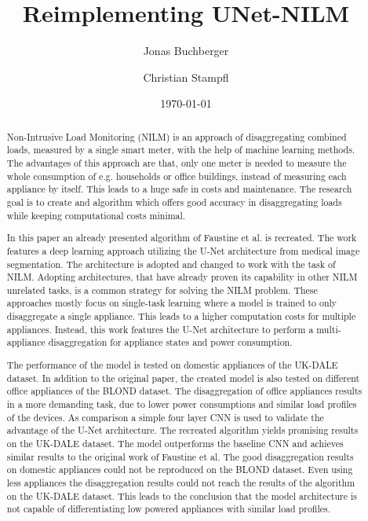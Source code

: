 \documentclass[sigconf]{acmart}
\title{Reimplementing UNet-NILM}
\date{\today}
\author{Jonas Buchberger}
\affiliation{Technical University Munich}
\affiliation{Munich, Germany}
\author{Christian Stampfl}
\affiliation{Technical University Munich}
\affiliation{Munich, Germany}
\begin{document}


\begin{abstract}
  Non-Intrusive Load Monitoring (NILM) is an approach of disaggregating combined loads, measured by a single smart meter, with the help of machine learning methods.
  The advantages of this approach are that, only one meter is needed to measure the whole consumption of e.g. households or office buildings, instead of measuring each appliance by itself.
  This leads to a huge safe in costs and maintenance.
  The research goal is to create and algorithm which offers good accuracy in disaggregating loads while keeping computational costs minimal.
  
  In this paper an already presented algorithm of Faustine et al. is recreated.
  The work features a deep learning approach utilizing the U-Net architecture from medical image segmentation.
  The architecture is adopted and changed to work with the task of NILM.
  Adopting architectures, that have already proven its capability in other NILM unrelated tasks, is a common strategy for solving the NILM problem. %
  These approaches mostly focus on single-task learning where a model is trained to only disaggregate a single appliance.
  This leads to a higher computation costs for multiple appliances.
  Instead, this work features the U-Net architecture to perform a multi-appliance disaggregation for appliance states and power consumption.

  The performance of the model is tested on domestic appliances of the UK-DALE dataset.
  In addition to the original paper, the created model is also tested on different office appliances of the BLOND dataset.
  The disaggregation of office appliances results in a more demanding task, due to lower power consumptions and similar load profiles of the devices.
  As comparison a simple four layer CNN is used to validate the advantage of the U-Net architecture.
  The recreated algorithm yields promising results on the UK-DALE dataset.
  The model outperforms the baseline CNN and achieves similar results to the original work of Faustine et al.
  The good disaggregation results on domestic appliances could not be reproduced on the BLOND dataset.
  Even using less appliances the disaggregation results could not reach the results of the algorithm on the UK-DALE dataset.
  This leads to the conclusion that the model architecture is not capable of differentiating low powered appliances with similar load profiles.
\end{abstract}
\end{document}
